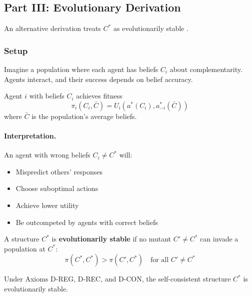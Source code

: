 \subsection{Part III: Evolutionary Derivation}
\label{sec:D-evolutionary}

An alternative derivation treats $C^*$ as evolutionarily stable
\citep{bowles2004, boydricherson}.

\subsubsection{Setup}

Imagine a population where each agent has beliefs $C_i$ about complementarity.
Agents interact, and their success depends on belief accuracy.

\begin{definition}[Fitness]
\label{def:D-fitness}
Agent $i$ with beliefs $C_i$ achieves fitness
\begin{equation}
\pi_i(C_i, \bar{C}) = U_i(a^*(C_i), a^*_{-i}(\bar{C}))
\end{equation}
where $\bar{C}$ is the population's average beliefs.
\end{definition}

\paragraph{Interpretation.}
An agent with wrong beliefs $C_i \neq C^*$ will:
\begin{itemize}[nosep]
    \item Mispredict others' responses
    \item Choose suboptimal actions
    \item Achieve lower utility
    \item Be outcompeted by agents with correct beliefs
\end{itemize}

\begin{definition}
\label{def:D-ess}
A structure $C^*$ is \textbf{evolutionarily stable} if no mutant
$C' \neq C^*$ can invade a population at $C^*$:
\begin{equation}
\pi(C^*, C^*) > \pi(C', C^*)
\quad \text{for all } C' \neq C^*
\end{equation}
\end{definition}

\begin{proposition}
\label{prop:D-ess}
Under Axioms D-REG, D-REC, and D-CON, the self-consistent structure
$C^*$ is evolutionarily stable.
\end{proposition}

